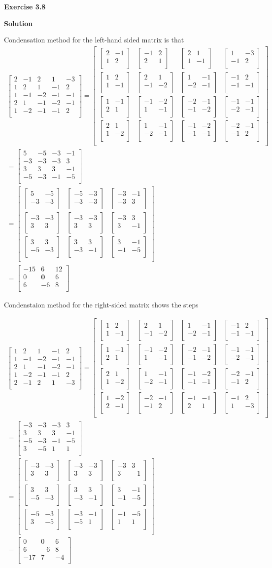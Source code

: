 \documentclass[12pt]{article}
\newcommand{\matxx}[2] {
\begin{bmatrix}
  #1 \\
  #2 \\
\end{bmatrix}
}
\newcommand{\matxxx}[3] {
\begin{bmatrix}
  #1 \\
  #2 \\
  #3 \\
\end{bmatrix}
}
\newcommand{\matxxxx}[4] {
\begin{bmatrix}
  #1 \\
  #2 \\
  #3 \\
  #4 \\
\end{bmatrix}
}
\newcommand{\matxxxxx}[5] {
\begin{bmatrix}
  #1 \\
  #2 \\
  #3 \\
  #4 \\
  #5 \\
\end{bmatrix}
}
\begin{document}
\bigskip

\textbf{Exercise 3.8}

\bigskip

\textbf{Solution}

Condensation method for the left-hand sided matrix is that
\[
\begin{split}
  \matxxxxx{2 & -1 & 2 & 1 & -3}{1 & 2 & 1 & -1 & 2}{1 & -1 & -2 & -1 & -1}{2 & 1 & -1 & -2 & -1}{1 & -2 & -1 & -1 & 2}
  = \matxxxx
  {
    \matxx{2 & -1}{1 & 2} &
    \matxx{-1 & 2}{2 & 1} &
    \matxx{2 & 1}{1 & -1} &
    \matxx{1 & -3}{-1 & 2}
  }
  {
    \matxx{1 & 2}{1 & -1} &
    \matxx{2 & 1}{-1 & -2} &
    \matxx{1 & -1}{-2 & -1} &
    \matxx{-1 & 2}{-1 & -1}
  }
  {
    \matxx{1 & -1}{2 & 1} &
    \matxx{-1 & -2}{1 & -1} &
    \matxx{-2 & -1}{-1 & -2} &
    \matxx{-1 & -1}{-2 & -1}
  }
  {
    \matxx{2 & 1}{1 & -2} &
    \matxx{1 & -1}{-2 & -1} &
    \matxx{-1 & -2}{-1 & -1} &
    \matxx{-2 & -1}{-1 & 2}
  } \\
  = \matxxxx{5 & -5 & -3 & -1}{-3 & -3 & -3 & 3}{3 & 3 & 3 & -1}{-5 & -3 & -1 & -5} \\
  = \matxxx
  {
    \matxx{5 & -5}{-3 & -3} &
    \matxx{-5 & -3}{-3 & -3} &
    \matxx{-3 & -1}{-3 & 3}
  }
  {
    \matxx{-3 & -3}{3 & 3} &
    \matxx{-3 & -3}{3 & 3} &
    \matxx{-3 & 3}{3 & -1}
  }
  {
    \matxx{3 & 3}{-5 & -3} &
    \matxx{3 & 3}{-3 & -1} &
    \matxx{3 & -1}{-1 & -5}
  } \\
  = \matxxx{-15 & 6 & 12}{0 & \mathbf{0} & 6}{6 & -6 & 8}
\end{split}
\]

Condenstaion method for the right-sided matrix shows the steps

\[
  \begin{split}
    \matxxxxx
    {1 &  2 & 1 &  -1 &  2}
    {1 & -1 & -2 & -1 & -1}
    {2 &  1 & -1 & -2 & -1}
    {1 & -2 & -1 & -1 &  2}
    {2 & -1 &  2 &  1 & -3}
    = \matxxxx
    {
      \matxx{1 & 2}{1 & -1} &
      \matxx{2 & 1}{-1 & -2} &
      \matxx{1 & -1}{-2 & -1} &
      \matxx{-1 & 2}{-1 & -1}
    }
    {
      \matxx{1 & -1}{2 & 1} &
      \matxx{-1 & -2}{1 & -1} &
      \matxx{-2 & -1}{-1 & -2} &
      \matxx{-1 & -1}{-2 & -1}
    }
    {
      \matxx{2 & 1}{1 & -2} &
      \matxx{1 & -1}{-2 & -1} &
      \matxx{-1 & -2}{-1 & -1} &
      \matxx{-2 & -1}{-1 & 2}
    }
    {
      \matxx{1 & -2}{2 & -1} &
      \matxx{-2 & -1}{-1 & 2} &
      \matxx{-1 & -1}{2 & 1} &
      \matxx{-1 & 2}{1 & -3}
    } \\
    = \matxxxx
    {-3 & -3 & -3 &  3}
    {3 &  3 &  3 & -1}
    {-5 & -3 & -1 & -5}
    {3 & -5 &  1 &  1} \\
    = \matxxx
    {
      \matxx{-3 & -3}{3 & 3} &
      \matxx{-3 & -3}{3 & 3} &
      \matxx{-3 & 3}{3 & -1}
    }
    {
      \matxx{3 & 3}{-5 & -3} &
      \matxx{3 & 3}{-3 & -1} &
      \matxx{3 & -1}{-1 & -5}
    }
    {
      \matxx{-5 & -3}{3 & -5} &
      \matxx{-3 & -1}{-5 & 1} &
      \matxx{-1 & -5}{1 & 1}
    } \\
    = \matxxx{0 & 0 & 6}{6 & -6 & 8}{-17 & 7 & -4}
  \end{split}
\]
\end{document}
